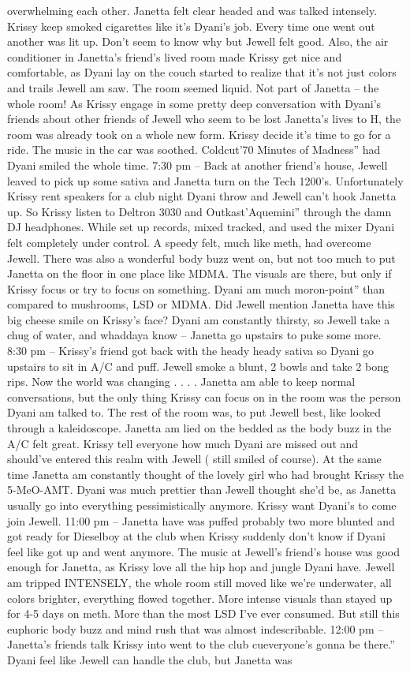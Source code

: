 \documentclass[12pt]{book}
\begin{document}
overwhelming each other. Janetta felt clear headed and was talked intensely. Krissy keep smoked cigarettes like it's Dyani's job. Every time one went out another was lit up. Don't seem to know why but Jewell felt good. Also, the air conditioner in Janetta's friend's lived room made Krissy get nice and comfortable, as Dyani lay on the couch started to realize that it's not just colors and trails Jewell am saw. The room seemed liquid. Not part of Janetta -- the whole room! As Krissy engage in some pretty deep conversation with Dyani's friends about other friends of Jewell who seem to be lost Janetta's lives to H, the room was already took on a whole new form. Krissy decide it's time to go for a ride. The music in the car was soothed. Coldcut'70 Minutes of Madness'' had Dyani smiled the whole time. 7:30 pm -- Back at another friend's house, Jewell leaved to pick up some sativa and Janetta turn on the Tech 1200's. Unfortunately Krissy rent speakers for a club night Dyani throw and Jewell can't hook Janetta up. So Krissy listen to Deltron 3030 and Outkast'Aquemini'' through the damn DJ headphones. While set up records, mixed tracked, and used the mixer Dyani felt completely under control. A speedy felt, much like meth, had overcome Jewell. There was also a wonderful body buzz went on, but not too much to put Janetta on the floor in one place like MDMA. The visuals are there, but only if Krissy focus or try to focus on something. Dyani am much moron-point'' than compared to mushrooms, LSD or MDMA. Did Jewell mention Janetta have this big cheese smile on Krissy's face? Dyani am constantly thirsty, so Jewell take a chug of water, and whaddaya know -- Janetta go upstairs to puke some more. 8:30 pm -- Krissy's friend got back with the heady heady sativa so Dyani go upstairs to sit in A/C and puff. Jewell smoke a blunt, 2 bowls and take 2 bong rips. Now the world was changing . . . . Janetta am able to keep normal conversations, but the only thing Krissy can focus on in the room was the person Dyani am talked to. The rest of the room was, to put Jewell best, like looked through a kaleidoscope. Janetta am lied on the bedded as the body buzz in the A/C felt great. Krissy tell everyone how much Dyani are missed out and should've entered this realm with Jewell ( still smiled of course). At the same time Janetta am constantly thought of the lovely girl who had brought Krissy the 5-MeO-AMT. Dyani was much prettier than Jewell thought she'd be, as Janetta usually go into everything pessimistically anymore. Krissy want Dyani's to come join Jewell. 11:00 pm -- Janetta have was puffed probably two more blunted and got ready for Dieselboy at the club when Krissy suddenly don't know if Dyani feel like got up and went anymore. The music at Jewell's friend's house was good enough for Janetta, as Krissy love all the hip hop and jungle Dyani have. Jewell am tripped INTENSELY, the whole room still moved like we're underwater, all colors brighter, everything flowed together. More intense visuals than stayed up for 4-5 days on meth. More than the most LSD I've ever consumed. But still this euphoric body buzz and mind rush that was almost indescribable. 12:00 pm -- Janetta's friends talk Krissy into went to the club cueveryone's gonna be there.'' Dyani feel like Jewell can handle the club, but Janetta was 
\end{document}
